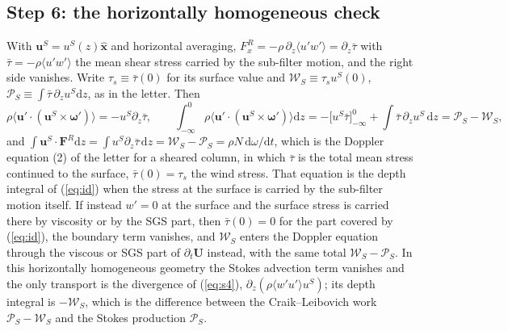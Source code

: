 \documentclass[10pt]{article}
\newcommand{\av}[1]{\langle #1\rangle}\newcommand{\uS}{\bm u^S}\newcommand{\WS}{\mathcal W_S}\newcommand{\PS}{\mathcal P_S}
\newcommand{\bu}{\bm u}\newcommand{\bU}{\bm U}\newcommand{\bxi}{\bm\xi}\newcommand{\dd}{\mathrm d}
\begin{document}
\subsection{Step 6: the horizontally homogeneous check}
With $\uS=u^S(z)\hat{\bm x}$ and horizontal averaging, $F^R_x=-\rho\,\partial_z\av{u'w'}=\partial_z\bar\tau$ with $\bar\tau=-\rho\av{u'w'}$ the mean shear stress carried by the sub-filter motion, and the right side vanishes. Write $\tau_s\equiv\bar\tau(0)$ for its surface value and $\WS\equiv\tau_su^S(0)$, $\PS\equiv\int\bar\tau\,\partial_zu^S\dd z$, as in the letter. Then
\[
\rho\av{\bu'\cdot(\uS\times\bm\omega')}=-u^S\partial_z\bar\tau,\qquad
\int_{-\infty}^0\rho\av{\bu'\cdot(\uS\times\bm\omega')}\dd z=-\big[u^S\bar\tau\big]_{-\infty}^{0}+\int\bar\tau\,\partial_zu^S\,\dd z=\PS-\WS,
\]
and $\int\uS\!\cdot\bm F^R\dd z=\int u^S\partial_z\bar\tau\,\dd z=\WS-\PS=\rho N\,\dd\omega/\dd t$, which is the Doppler equation (2) of the letter for a sheared column, in which $\bar\tau$ is the total mean stress continued to the surface, $\bar\tau(0)=\tau_s$ the wind stress. That equation is the depth integral of (\ref{eq:id}) when the stress at the surface is carried by the sub-filter motion itself. If instead $w'=0$ at the surface and the surface stress is carried there by viscosity or by the SGS part, then $\bar\tau(0)=0$ for the part covered by (\ref{eq:id}), the boundary term vanishes, and $\WS$ enters the Doppler equation through the viscous or SGS part of $\partial_t\bU$ instead, with the same total $\WS-\PS$. In this horizontally homogeneous geometry the Stokes advection term vanishes and the only transport is the divergence of (\ref{eq:s4}), $\partial_z(\rho\av{w'u'}u^S)$; its depth integral is $-\WS$, which is the difference between the Craik--Leibovich work $\PS-\WS$ and the Stokes production $\PS$.
\end{document}
